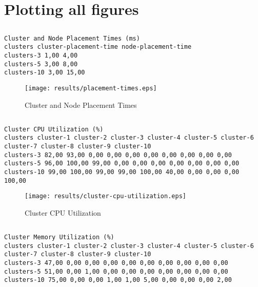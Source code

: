 \documentclass{elsart}
\begin{document}
\section{Plotting all figures}
\subsection{}

\begin{lstlisting}[caption={Cluster and Node Placement Times}]
Cluster and Node Placement Times (ms)
clusters cluster-placement-time node-placement-time
clusters-3 1,00 4,00
clusters-5 3,00 8,00
clusters-10 3,00 15,00
\end{lstlisting}

\begin{figure}[ht]
\centering
\texttt{[image: results/placement-times.eps]}
\caption{Cluster and Node Placement Times}\label{fig:placement-times.eps}
\end{figure}

\subsection{}

\begin{lstlisting}[caption={Cluster CPU Utilization}]
Cluster CPU Utilization (%)
clusters cluster-1 cluster-2 cluster-3 cluster-4 cluster-5 cluster-6 cluster-7 cluster-8 cluster-9 cluster-10
clusters-3 82,00 93,00 0,00 0,00 0,00 0,00 0,00 0,00 0,00 0,00
clusters-5 96,00 100,00 99,00 0,00 0,00 0,00 0,00 0,00 0,00 0,00
clusters-10 99,00 100,00 99,00 99,00 100,00 40,00 0,00 0,00 0,00 100,00
\end{lstlisting}

\begin{figure}[ht]
\centering
\texttt{[image: results/cluster-cpu-utilization.eps]}
\caption{Cluster CPU Utilization}\label{fig:cluster-cpu-utilization.eps}
\end{figure}

\subsection{}

\begin{lstlisting}[caption={Cluster Memory Utilization}]
Cluster Memory Utilization (%)
clusters cluster-1 cluster-2 cluster-3 cluster-4 cluster-5 cluster-6 cluster-7 cluster-8 cluster-9 cluster-10
clusters-3 47,00 0,00 0,00 0,00 0,00 0,00 0,00 0,00 0,00 0,00
clusters-5 51,00 0,00 1,00 0,00 0,00 0,00 0,00 0,00 0,00 0,00
clusters-10 75,00 0,00 0,00 1,00 1,00 5,00 0,00 0,00 0,00 2,00
\end{lstlisting}
\end{document}
